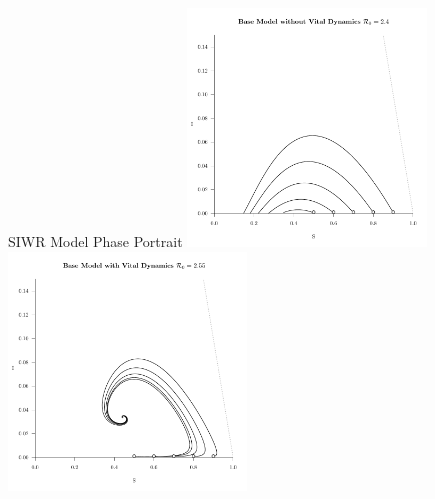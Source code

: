 \documentclass{beamer}\usepackage[]{graphicx}\usepackage[]{color}
\begin{document}
\begin{frame}{SIWR Model Phase Portrait}
\includegraphics[width=0.475\textwidth]{images/phasebasewithoutvital.pdf}
\hfill
\includegraphics[width=0.475\textwidth]{images/phasebasewithvital.pdf}
\end{frame}
\end{document}
